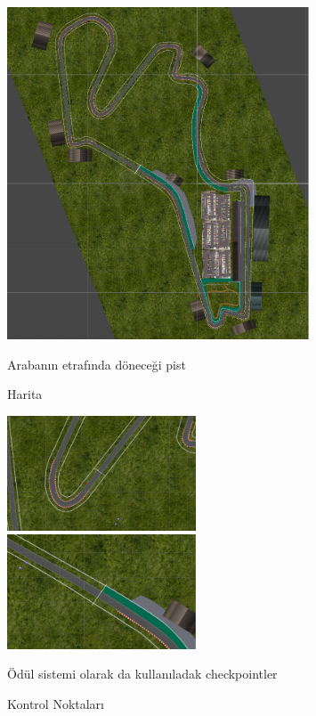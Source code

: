 \documentclass{article}
\begin{document}
\begin{figure}
     \centering
  \includegraphics[width=0.8\textwidth]{map.png}\centering
  \caption{Harita}
  \label{fig:resim_etiketi}
  \vspace{0.5cm}
  {Arabanın etrafında döneceği pist}
\end{figure}

\begin{figure}
     \centering
  \includegraphics[width=0.5\textwidth]{checkpoint1.png}\centering
  \includegraphics[width=0.5\textwidth]{checkpoint2.png}\centering
  \caption{Kontrol Noktaları}
  \label{fig:resim_etiketi}
  \vspace{0.5cm}
  {Ödül sistemi olarak da kullanıladak checkpointler}
\end{figure}
\end{document}
